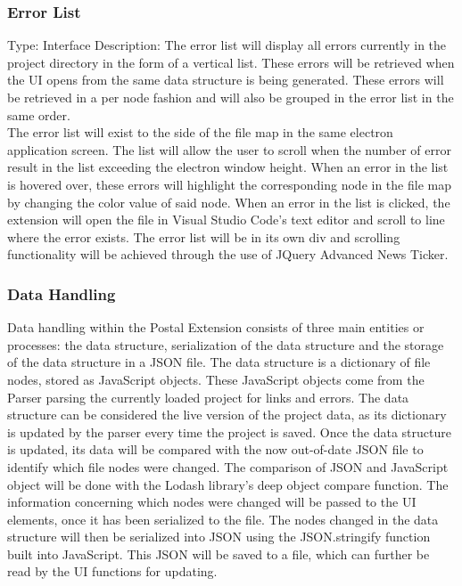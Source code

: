 \documentclass[letterpaper,10pt,titlepage,draftclsnofoot,onecolumn,onesided] {IEEEtran}
\begin{document}
	\subsubsection{Error List}
	Type: Interface
	Description: 
	The error list will display all errors currently in the project directory in the form of a vertical list. 
	These errors will be retrieved when the UI opens from the same data structure is being generated. 
	These errors will be retrieved in a per node fashion and will also be grouped in the error list in the same order. 
	\\
	The error list will exist to the side of the file map in the same electron application screen. 
	The list will allow the user to scroll when the number of error result in the list exceeding the electron window height. 
	When an error in the list is hovered over, these errors will highlight the corresponding node in the file map by changing the color value of said node. 
	When an error in the list is clicked, the extension will open the file in Visual Studio Code's text editor and scroll to line where the error exists.
	The error list will be in its own div and scrolling functionality will be achieved through the use of JQuery Advanced News Ticker.
	
	\subsubsection{Data Handling}
	Data handling within the Postal Extension consists of three main entities or processes: the data structure, serialization of the data structure and the storage of the data structure in a JSON file.
	The data structure is a dictionary of file nodes, stored as JavaScript objects. These JavaScript objects come from the Parser parsing the currently loaded project for links and errors.
	The data structure can be considered the live version of the project data, as its dictionary is updated by the parser every time the project is saved. 
	Once the data structure is updated, its data will be compared with the now out-of-date JSON file to identify which file nodes were changed.
	The comparison of JSON and JavaScript object will be done with the Lodash library's deep object compare function.
	The information concerning which nodes were changed will be passed to the UI elements, once it has been serialized to the file.
	The nodes changed in the data structure will then be serialized into JSON using the JSON.stringify function built into JavaScript.
	This JSON will be saved to a file, which can further be read by the UI functions for updating. \cite{stringify} \cite{lodash}
	
\end{document}
